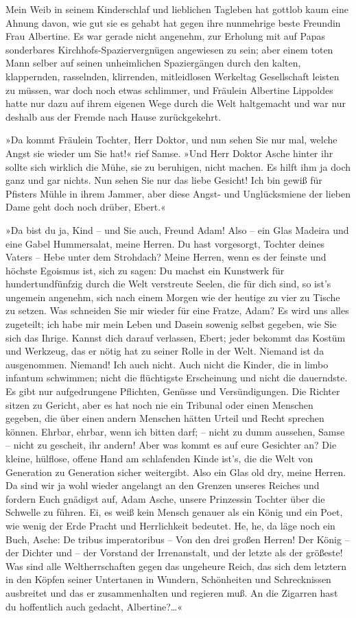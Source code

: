 Mein Weib in seinem Kinderschlaf und lieblichen Tagleben hat
gottlob kaum eine Ahnung davon, wie gut sie es gehabt hat gegen
ihre nunmehrige beste Freundin Frau Albertine. Es war gerade nicht
angenehm, zur Erholung mit auf Papas sonderbares
Kirchhofs-Spaziervergnügen angewiesen zu sein; aber einem toten
Mann selber auf seinen unheimlichen Spaziergängen durch den kalten,
klappernden, rasselnden, klirrenden, mitleidlosen Werkeltag
Gesellschaft leisten zu müssen, war doch noch etwas schlimmer, und
Fräulein Albertine Lippoldes hatte nur dazu auf ihrem eigenen Wege
durch die Welt haltgemacht und war nur deshalb aus der Fremde nach
Hause zurückgekehrt.

»Da kommt Fräulein Tochter, Herr Doktor, und nun sehen Sie nur mal,
welche Angst sie wieder um Sie hat!« rief Samse. »Und Herr Doktor
Asche hinter ihr sollte sich wirklich die Mühe, sie zu beruhigen,
nicht machen. Es hilft ihm ja doch ganz und gar nichts. Nun sehen
Sie nur das liebe Gesicht! Ich bin gewiß für Pfisters Mühle in
ihrem Jammer, aber diese Angst- und Unglücksmiene der lieben Dame
geht doch noch drüber, Ebert.«

»Da bist du ja, Kind – und Sie auch, Freund Adam! Also – ein Glas
Madeira und eine Gabel Hummersalat, meine Herren. Du hast
vorgesorgt, Tochter deines Vaters – Hebe unter dem Strohdach? Meine
Herren, wenn es der feinste und höchste Egoismus ist, sich zu
sagen: Du machst ein Kunstwerk für hundertundfünfzig durch die Welt
verstreute Seelen, die für dich sind, so ist's ungemein angenehm,
sich nach einem Morgen wie der heutige zu vier zu Tische zu setzen.
Was schneiden Sie mir wieder für eine Fratze, Adam? Es wird uns
alles zugeteilt; ich habe mir mein Leben und Dasein sowenig selbst
gegeben, wie Sie sich das Ihrige. Kannst dich darauf verlassen,
Ebert; jeder bekommt das Kostüm und Werkzeug, das er nötig hat zu
seiner Rolle in der Welt. Niemand ist da ausgenommen. Niemand! Ich
auch nicht. Auch nicht die Kinder, die in limbo infantum schwimmen;
nicht die flüchtigste Erscheinung und nicht die dauerndste. Es gibt
nur aufgedrungene Pflichten, Genüsse und Versündigungen. Die
Richter sitzen zu Gericht, aber es hat noch nie ein Tribunal oder
einen Menschen gegeben, die über einen andern Menschen hätten
Urteil und Recht sprechen können. Ehrbar, ehrbar, wenn ich bitten
darf; – nicht zu dumm aussehen, Samse – nicht zu gescheit, ihr
andern! Aber was kommt es auf eure Gesichter an? Die kleine,
hülflose, offene Hand am schlafenden Kinde ist's, die die Welt von
Generation zu Generation sicher weitergibt. Also ein Glas old dry,
meine Herren. Da sind wir ja wohl wieder angelangt an den Grenzen
unseres Reiches und fordern Euch gnädigst auf, Adam Asche, unsere
Prinzessin Tochter über die Schwelle zu führen. Ei, es weiß kein
Mensch genauer als ein König und ein Poet, wie wenig der Erde
Pracht und Herrlichkeit bedeutet. He, he, da läge noch ein Buch,
Asche: De tribus imperatoribus – Von den drei großen Herren! Der
König – der Dichter und – der Vorstand der Irrenanstalt, und der
letzte als der größeste! Was sind alle Weltherrschaften gegen das
ungeheure Reich, das sich dem letztern in den Köpfen seiner
Untertanen in Wundern, Schönheiten und Schrecknissen ausbreitet und
das er zusammenhalten und regieren muß. An die Zigarren hast du
hoffentlich auch gedacht, Albertine?\ldots{}«

